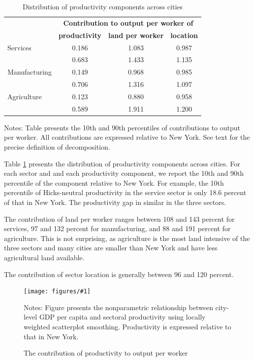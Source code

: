\documentclass[12pt]{article}
\newcommand{\dofigure}[3]{\begin{figure}
\begin{centering}
\texttt{[image: figures/\#1]}
  \caption{#2\label{fig:#1}}
\end{centering}

\noindent \footnotesize{#3}
\end{figure}}
\begin{document}
\begin{table}[h!]
  \begin{center}
  \caption{Distribution of productivity components across cities\label{tab:decomposition}}
    \begin{tabular}{lccc}
    \toprule
    \textbf{} & \multicolumn{3}{c}{\textbf{Contribution to output per worker of}}\\
    \textbf{} & \textbf{productivity} & \textbf{land per worker} & \textbf{location} \\
    \midrule
Services	& 0.186	& 1.083	& 0.987	\\
	& 0.683	& 1.433	& 1.135	\\
				
Manufacturing	& 0.149	& 0.968	& 0.985	\\
	& 0.706	& 1.316	& 1.097	\\
				
Agriculture	& 0.123	& 0.880	& 0.958	\\
	& 0.589	& 1.911	& 1.200	\\
    \bottomrule
    \end{tabular}%

  \end{center}
  \noindent \footnotesize{Notes: Table presents the 10th and 90th percentiles of contributions to output per worker. All contributions are expressed relative to New York. See text for the precise definition of decomposition.}
\end{table}

Table \ref{tab:decomposition} presents the distribution of productivity components across cities. For each sector and and each productivity component, we report the 10th and 90th percentile of the component relative to New York. For example, the 10th percentile of Hicks-neutral productivity in the service sector is only 18.6 percent of that in New York. The productivity gap in similar in the three sectors.

The contribution of land per worker ranges between 108 and 143 percent for services, 97 and 132 percent for manufacturing, and 88 and 191 percent for agriculture. This is not surprising, as agriculture is the most land intensive of the three sectors and many cities are smaller than New York and have less agricultural land available.

The contribution of sector location is generally between 96 and 120 percent.

\dofigure{city_level_inputs/productivity}{The contribution of productivity to output per worker}{Notes: Figure presents the nonparametric relationship between city-level GDP per capita and sectoral productivity using locally weighted scatterplot smoothing. Productivity is expressed relative to that in New York.}
\end{document}
